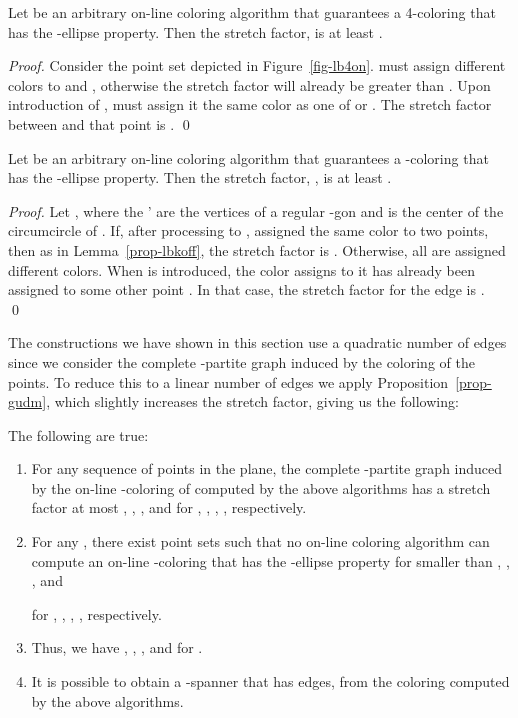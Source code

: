 \documentclass[pdftex,leqno,fleqn,12pts]{llncs}
\begin{document}
\begin{lemma} 
Let  be an arbitrary on-line coloring algorithm
that guarantees a 4-coloring that has the -ellipse property. Then
the stretch factor,  is at least .
\end{lemma}
\begin{proof} 
Consider the point set depicted in Figure~\ref{fig-lb4on}.
 must assign different colors to  and , otherwise the stretch factor will already be greater than . 
Upon introduction 
of ,  must assign it the same color as one of  or . The stretch factor between  and that 
point is . 
\qed 
\end{proof}

\begin{lemma} 
Let  be an arbitrary on-line coloring algorithm that 
guarantees a -coloring that has the -ellipse property. Then the stretch factor, , is at 
least .
\end{lemma}
\begin{proof} 
Let , where the ' are the vertices of
a regular -gon  and  is the center of the circumcircle of
. If, after processing  to ,  assigned the
same color to two points, then as in Lemma~\ref{prop-lbkoff},
the stretch factor is . Otherwise, all  are
assigned different colors. When  is introduced, the color
 assigns to it has already been assigned to some other
point . In that case, the stretch factor for the edge  is
.
\qed 
\end{proof}



The constructions we have shown in this section use a quadratic number of edges since we 
consider the complete -partite graph induced by the coloring of the points. 
To reduce this to a linear number of edges we apply Proposition~\ref{prop-gudm}, 
which slightly increases the stretch factor, giving us the following:




\begin{theorem}
The following are true:
\begin{enumerate}
\item
For any sequence  of points in the plane, the complete -partite graph 
induced by the on-line -coloring of  computed by the above algorithms 
has a stretch factor at most
, , , and 
 for , , , , respectively. 


\item
For any , there exist point sets such that no on-line coloring algorithm can 
compute an on-line -coloring that has the -ellipse property for  smaller than
, , , and 
 
for , , , , respectively.


\item
Thus, we have
, , , and 
 for .

\item
It is possible to obtain a -spanner that has  edges, from 
the coloring computed by the above algorithms.

\end{enumerate}
\end{theorem}
\end{document}
